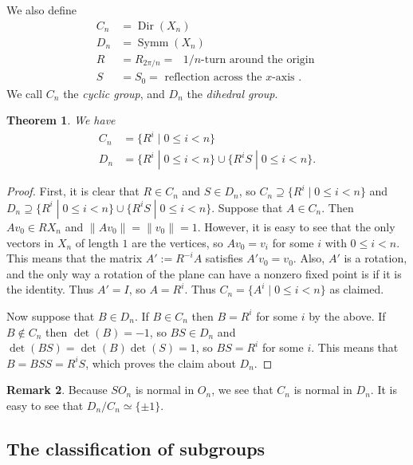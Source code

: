 \documentclass{amsart}
\DeclareMathOperator{\Dir}      {Dir}
\DeclareMathOperator{\Symm}     {Symm}
\newcommand{\st}        {\;|\;}
\renewcommand{\:}{\colon}
\newtheorem{theorem}{Theorem}[section]
\theoremstyle{definition}
\newtheorem{remark}[theorem]{Remark}
\begin{document}
We also define
\begin{align*}
 C_n &= \Dir(X_n) \\
 D_n &= \Symm(X_n) \\
 R   &= R_{2\pi/n} = \text{ $1/n$-turn around the origin } \\
 S   &= S_0 = \text{ reflection across the $x$-axis }.
\end{align*}
We call $C_n$ the \emph{cyclic group}, and $D_n$ the \emph{dihedral
  group}.

\begin{theorem}
 We have
 \begin{align*}
  C_n &= \{ R^i\st 0\leq i<n \} \\
  D_n &= \{ R^i\st 0\leq i<n \} \cup
         \{ R^iS\st 0\leq i<n \}.
 \end{align*}
\end{theorem}
\begin{proof}
 First, it is clear that $R\in C_n$ and $S\in D_n$, so
 $C_n\supseteq\{R^i\st 0\leq i<n\}$ and
 $D_n\supseteq\{R^i\st 0\leq i<n\}\cup\{R^iS\st 0\leq i<n\}$.
 Suppose that $A\in C_n$.  Then $Av_0\in RX_n$ and
 $\|Av_0\|=\|v_0\|=1$.  However, it is easy to see that the only
 vectors in $X_n$ of length $1$ are the vertices, so $Av_0=v_i$ for
 some $i$ with $0\leq i<n$.  This means that the matrix $A':=R^{-i}A$
 satisfies $A'v_0=v_0$.  Also, $A'$ is a rotation, and the only way a
 rotation of the plane can have a nonzero fixed point is if it is the
 identity.  Thus $A'=I$, so $A=R^i$.  Thus $C_n=\{A^i\st 0\leq i<n\}$
 as claimed.

 Now suppose that $B\in D_n$.  If $B\in C_n$ then $B=R^i$ for some $i$
 by the above.  If $B\not\in C_n$ then $\det(B)=-1$, so $BS\in D_n$
 and $\det(BS)=\det(B)\det(S)=1$, so $BS=R^i$ for some $i$.  This
 means that $B=BSS=R^iS$, which proves the claim about $D_n$.
\end{proof}

\begin{remark}\label{rem-Cn-Dn-normal}
 Because $SO_n$ is normal in $O_n$, we see that $C_n$ is normal in
 $D_n$.  It is easy to see that $D_n/C_n\simeq\{\pm 1\}$.
\end{remark}

\subsection{The classification of subgroups}
\end{document}
